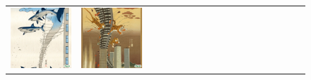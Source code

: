 \begin{figure}[ht!]
\begin{adjustwidth}{-0.8in}{-0.5in}
\begin{tabular}{cccccccccccccccccccc}
\multicolumn{2}{c}{\includegraphics[width=\threebythreecolwidth\textwidth]{figures/cherries/sharks_hokusai.jpg}} &
\multicolumn{2}{c}{\includegraphics[width=\threebythreecolwidth\textwidth]{figures/cherries/tiger_hokusai.jpg}} &

\end{tabular}
\end{adjustwidth}
\end{figure}
